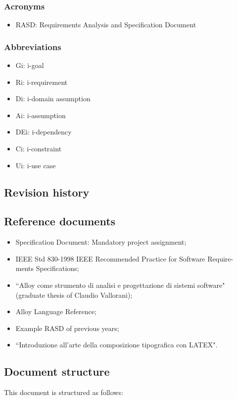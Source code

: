\documentclass[12pt,titlepage]{article}
\begin{document}
\subsubsection{Acronyms}\label{RASD}
\begin{itemize}
\item	RASD: Requirements Analysis and Specification Document
\end{itemize}
\subsubsection{Abbreviations}\label{RASD}
\begin{itemize}
\item	Gi: i-goal
\item	Ri: i-requirement
\item	Di: i-domain assumption
\item Ai: i-assumption 
\item DEi: i-dependency
\item Ci: i-constraint
\item Ui: i-use case
\end{itemize}
\subsection{Revision history}\label{RASD}

\subsection{Reference documents}\label{RASD}
\begin{itemize}
\item Specification Document: Mandatory project assignment;
\item IEEE Std 830-1998 IEEE Recommended Practice for Software Require-
ments Specifications;
\item``Alloy come strumento di analisi e progettazione di sistemi software" (graduate thesis of Claudio Vallorani);
\item Alloy Language Reference;
\item Example RASD of previous years;
\item ``Introduzione all'arte della composizione tipografica con LATEX".
\end{itemize}


\subsection{Document structure}\label{RASD}
This document is structured as follows:
\end{document}
